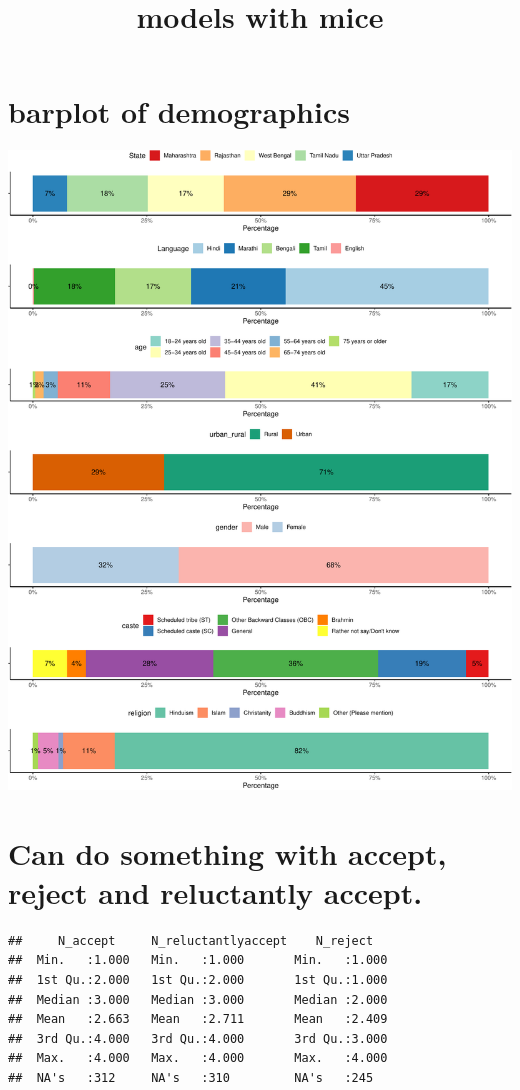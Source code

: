 \documentclass[
]{article}
\title{models with mice}
\author{}
\date{\vspace{-2.5em}}
\begin{document}
\maketitle

{
\setcounter{tocdepth}{2}
\tableofcontents
}
\hypertarget{barplot-of-demographics}{%
\section{barplot of demographics}\label{barplot-of-demographics}}

\includegraphics[width=0.8\linewidth,height=0.8\textheight]{withmice_files/figure-latex/unnamed-chunk-3-1}

\hypertarget{can-do-something-with-accept-reject-and-reluctantly-accept.}{%
\section{Can do something with accept, reject and reluctantly
accept.}\label{can-do-something-with-accept-reject-and-reluctantly-accept.}}

\begin{verbatim}
##     N_accept     N_reluctantlyaccept    N_reject    
##  Min.   :1.000   Min.   :1.000       Min.   :1.000  
##  1st Qu.:2.000   1st Qu.:2.000       1st Qu.:1.000  
##  Median :3.000   Median :3.000       Median :2.000  
##  Mean   :2.663   Mean   :2.711       Mean   :2.409  
##  3rd Qu.:4.000   3rd Qu.:4.000       3rd Qu.:3.000  
##  Max.   :4.000   Max.   :4.000       Max.   :4.000  
##  NA's   :312     NA's   :310         NA's   :245
\end{verbatim}
\end{document}
